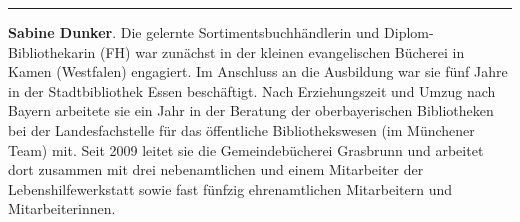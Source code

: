 \begin{center}\rule{0.5\linewidth}{0.5pt}\end{center}

\textbf{Sabine Dunker}. Die gelernte Sortimentsbuchhändlerin und
Diplom-Bibliothekarin (FH) war zunächst in der kleinen evangelischen
Bücherei in Kamen (Westfalen) engagiert. Im Anschluss an die Ausbildung
war sie fünf Jahre in der Stadtbibliothek Essen beschäftigt. Nach
Erziehungszeit und Umzug nach Bayern arbeitete sie ein Jahr in der
Beratung der oberbayerischen Bibliotheken bei der Landesfachstelle für
das öffentliche Bibliothekswesen (im Münchener Team) mit. Seit 2009
leitet sie die Gemeindebücherei Grasbrunn und arbeitet dort zusammen mit
drei nebenamtlichen und einem Mitarbeiter der Lebenshilfewerkstatt sowie
fast fünfzig ehrenamtlichen Mitarbeitern und Mitarbeiterinnen.
